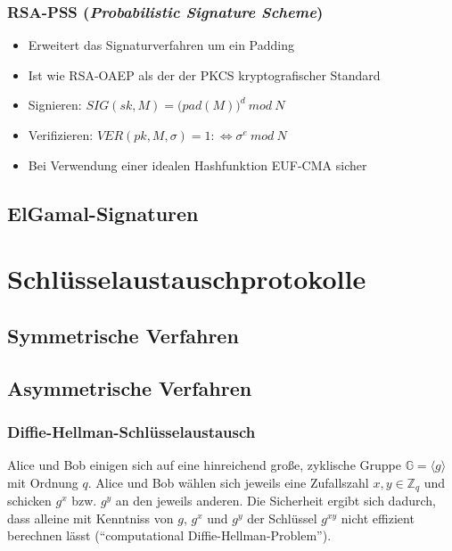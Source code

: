 \subsubsection{RSA-PSS (\textit{Probabilistic Signature Scheme})}
\begin{itemize}
	\item Erweitert das Signaturverfahren um ein Padding
	\item Ist wie RSA-OAEP als der der PKCS kryptografischer Standard
	\item Signieren: \(SIG(sk,M) = \big(pad(M)\big)^d~mod~N\)
	\item Verifizieren: \(VER(pk,M,\sigma)=1 :\Leftrightarrow \sigma^e~mod~N\)
	\item Bei Verwendung einer idealen Hashfunktion EUF-CMA sicher
\end{itemize}


\subsection{ElGamal-Signaturen}



\section{Schlüsselaustauschprotokolle}

\subsection{Symmetrische Verfahren}


\subsection{Asymmetrische Verfahren}

\subsubsection{Diffie-Hellman-Schlüsselaustausch}
Alice und Bob einigen sich auf eine hinreichend große, zyklische Gruppe \(\mathbb{G} = \langle g \rangle\) mit Ordnung
\(q\). Alice und Bob wählen sich jeweils eine Zufallszahl \(x, y \in
\mathbb{Z}_q\) und schicken \(g^x\) bzw. \(g^y\) an den jeweils
anderen. Die Sicherheit ergibt sich dadurch, dass alleine mit Kenntniss von \(g\), \(g^x\) und \(g^y\) der Schlüssel \(g^{xy}\) nicht effizient berechnen lässt ("`computational Diffie-Hellman-Problem"').

